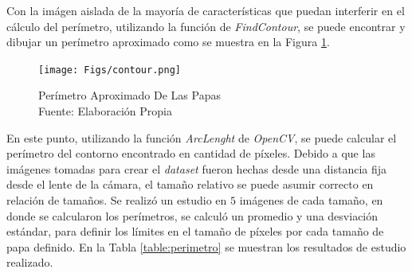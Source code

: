 \newpage
Con la imágen aislada de la mayoría de características que puedan interferir en el cálculo del perímetro, utilizando la función de \textit{FindContour}, se puede encontrar y dibujar un perímetro aproximado como se muestra en la Figura \ref{fig:contour}.

\begin{figure}[ht]
	\centering
	\texttt{[image: Figs/contour.png]}
	\caption{Perímetro Aproximado De Las Papas\\Fuente: Elaboración Propia}
	\label{fig:contour}
\end{figure}

En este punto, utilizando la función \textit{ArcLenght} de \textit{OpenCV}, se puede calcular el perímetro del contorno encontrado en cantidad de píxeles. Debido a que las imágenes tomadas para crear el \textit{dataset} fueron hechas desde una distancia fija desde el lente de la cámara, el tamaño relativo se puede asumir correcto en relación de tamaños. Se realizó un estudio en $5$ imágenes de cada tamaño, en donde se calcularon los perímetros, se calculó un promedio y una desviación estándar, para definir los límites en el tamaño de píxeles por cada tamaño de papa definido. En la Tabla \ref{table:perimetro} se muestran los resultados de estudio realizado.

